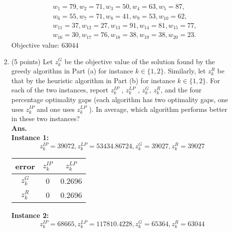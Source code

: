 \documentclass[12pt]{article}
\begin{document}
\begin{enumerate}
\begin{enumerate}
\begin{align*}
                               & w_{1} = 79, w_{2} = 71, w_{3} = 50, w_{4} = 63, w_{5} = 87,      \\
                               & w_{6} = 55, w_{7} = 71, w_{8} = 41, w_{9} = 53, w_{10} = 62,     \\
                               & w_{11} = 37, w_{12} = 27, w_{13} = 91, w_{14} = 81, w_{15} = 77, \\
                               & w_{16} = 30, w_{17} = 76, w_{18} = 38, w_{19} = 38, w_{20} = 23.
                        \end{align*}
                        Objective value:  $63044$
                  \item (5 points) Let $z_k^G$ be the objective value of the solution found by the greedy algorithm in Part (a) for instance $k \in \{1,2\}$. Similarly, let $z_k^R$ be that by the heuristic algorithm in Part (b) for instance $k \in \{1, 2\}$. For each of the two instances, report $z_k^{IP}$ , $z_k^{LP}$ , $z_k^G$, $z_k^R$, and the four percentage optimality gaps (each algorithm has two optimality gaps, one uses $z_k^{IP}$ and one uses $z_k^{LP}$ ). In average, which algorithm performs better in these two instances?\\
                        \textbf{Ans.}\\
                        \textbf{Instance 1:}
                        \begin{equation*}
                              z^{IP}_k = 39072, z^{LP} _k= 53434.86724, z^{G}_k = 39027, z^{R}_k = 39027
                        \end{equation*}
                        \begin{table}[H]
                              \centering
                              \begin{tabular}{c|c|c|}
                                    error     & $z^{IP}_k$ & $z^{LP}_k$ \\
                                    \hline
                                    $z^{G}_k$ & 0          & 0.2696     \\
                                    \hline
                                    $z^{R}_k$ & 0          & 0.2696     \\
                              \end{tabular}
                        \end{table}
                        \textbf{Instance 2:}
                        \begin{equation*}
                              z^{IP}_k = 68665, z^{LP}_k = 117810.4228, z^{G}_k = 65364, z^{R}_k = 63044

\end{equation*}
\end{enumerate}
\end{enumerate}
\end{document}
